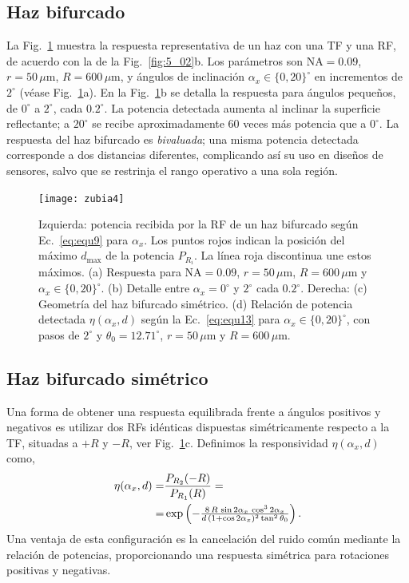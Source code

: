 \documentclass[11pt,a4paper]{article}
\begin{document}
\begin{multicols}{2}
\subsection{Haz bifurcado}\label{sec:5_02_01}
La Fig.~\ref{fig:5_04} muestra la respuesta representativa de un haz con una TF y una RF, de acuerdo con la de la Fig.~\ref{fig:5_02}b. Los parámetros son $\text{NA}=0.09$, $r=50\,\mu\text{m}$, $R=600\,\mu\text{m}$, y ángulos de inclinación $\alpha_x\in\{0,20\}^\circ$ en incrementos de $2^\circ$ (véase Fig.~\ref{fig:5_04}a). En la Fig.~\ref{fig:5_04}b se detalla la respuesta para ángulos pequeños, de $0^\circ$ a $2^\circ$, cada $0.2^\circ$.
La potencia detectada aumenta al inclinar la superficie reflectante; a $20^\circ$ se recibe aproximadamente 60 veces más potencia que a $0^\circ$. La respuesta del haz bifurcado es \emph{bivaluada}; una misma potencia detectada corresponde a dos distancias diferentes, complicando así su uso en diseños de sensores, salvo que se restrinja el rango operativo a una sola región.
\begin{figure}[t]
    \centering
    \texttt{[image: zubia4]}
    \caption{%
        Izquierda: potencia recibida por la RF de un haz bifurcado según Ec.~\eqref{eq:equ9} para $\alpha_x$. Los puntos rojos indican la posición del máximo $d_{\text{max}}$ de la potencia $P_{R_i}$. La línea roja discontinua une estos máximos. (a) Respuesta para $\text{NA}=0.09$, $r=50\,\mu$m, $R=600\,\mu$m y $\alpha_x\in\{0,20\}^\circ$. (b) Detalle entre $\alpha_x=0^\circ$ y $2^\circ$ cada $0.2^\circ$. Derecha: (c) Geometría del haz bifurcado simétrico. (d) Relación de potencia detectada $\eta(\alpha_x,d)$ según la Ec.~\eqref{eq:equ13} para $\alpha_x\in\lbrace0,20\rbrace^\circ$, con pasos de $2^\circ$ y $\theta_0=12.71^\circ$, $r=50\,\mu\text{m}$ y $R=600\,\mu\text{m}$.}
    \label{fig:5_04}
\end{figure}
\unskip
\subsection{Haz bifurcado simétrico}\label{sec:5_02_02}
Una forma de obtener una respuesta equilibrada frente a ángulos positivos y negativos es utilizar dos RFs idénticas dispuestas simétricamente respecto a la TF, situadas a $+R$ y $-R$, ver Fig.~\ref{fig:5_04}c. Definimos la responsividad $\eta(\alpha_x,d)$ como,
\begin{align}
    \eta(\alpha_x,d) =& \frac{P_{R_2}(-R)}{P_{R_1}(R)}
    =\notag\\
    =&\exp\left(-\tfrac{8\,R\,\sin 2\alpha_x\,\cos^3 2\alpha_x}{d\,(1+\cos 2\alpha_x)^2\tan^2\theta_0}\right).
    \label{eq:equ13}
\end{align}
Una ventaja de esta configuración es la cancelación del ruido común mediante la relación de potencias, proporcionando una respuesta simétrica para rotaciones positivas y negativas.
%
%

\end{multicols}
\end{document}
